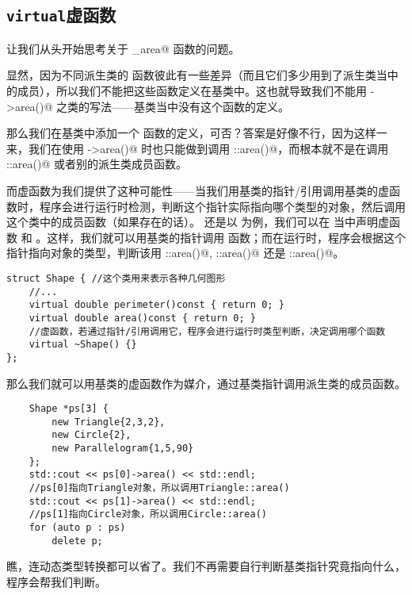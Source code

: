\subsection*{\texttt{virtual}虚函数}
让我们从头开始思考关于 \lstinline@shape_area@ 函数的问题。\par
显然，因为不同派生类的 \lstinline@area@ 函数彼此有一些差异（而且它们多少用到了派生类当中的成员），所以我们不能把这些函数定义在基类中。这也就导致我们不能用 \lstinline@sh->area()@ 之类的写法——基类当中没有这个函数的定义。\par
那么我们在基类中添加一个 \lstinline@area@ 函数的定义，可否？答案是好像不行，因为这样一来，我们在使用 \lstinline@sh->area()@ 时也只能做到调用 \lstinline@Shape::area()@，而根本就不是在调用 \lstinline@Triangle::area()@ 或者别的派生类成员函数。\par
而虚函数为我们提供了这种可能性——当我们用基类的指针/引用调用基类的虚函数时，程序会进行运行时检测，判断这个指针实际指向哪个类型的对象，然后调用这个类中的成员函数（如果存在的话）。
还是以 \lstinline@Shape@ 为例，我们可以在 \lstinline@Shape@ 当中声明虚函数 \lstinline@perimeter@ 和 \lstinline@area@。这样，我们就可以用基类的指针调用 \lstinline@area@ 函数；而在运行时，程序会根据这个指针指向对象的类型，判断该用 \lstinline@Triangle::area()@, \lstinline@Circle::area()@ 还是 \lstinline@Parallelogram::area()@。\pagebreak
\begin{lstlisting}
struct Shape { //这个类用来表示各种几何图形
    //...
    virtual double perimeter()const { return 0; }
    virtual double area()const { return 0; }
    //虚函数，若通过指针/引用调用它，程序会进行运行时类型判断，决定调用哪个函数
    virtual ~Shape() {} 
};
\end{lstlisting}
那么我们就可以用基类的虚函数作为媒介，通过基类指针调用派生类的成员函数。
\begin{lstlisting}
    Shape *ps[3] {
        new Triangle{2,3,2},
        new Circle{2},
        new Parallelogram{1,5,90}
    };
    std::cout << ps[0]->area() << std::endl;
    //ps[0]指向Triangle对象，所以调用Triangle::area()
    std::cout << ps[1]->area() << std::endl;
    //ps[1]指向Circle对象，所以调用Circle::area()
    for (auto p : ps)
        delete p;
\end{lstlisting}
瞧，连动态类型转换都可以省了。我们不再需要自行判断基类指针究竟指向什么，程序会帮我们判断。\par
